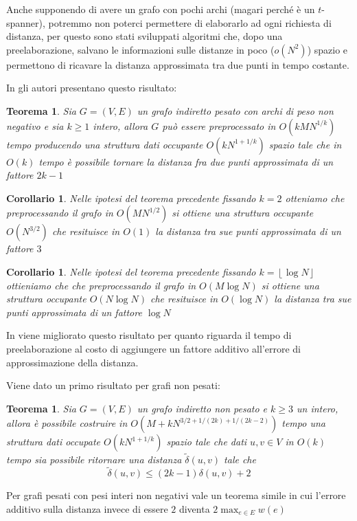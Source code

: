 \documentclass[a4paper,10pt]{amsbook}
\newcounter{counter1}
\theoremstyle{plain}
\newtheorem{myteo}[counter1]{Teorema}
\newtheorem{mycor}[counter1]{Corollario}
\theoremstyle{definition}
\theoremstyle{remark}
\newcommand{\pa}[1]{\left(#1\right)}
\newcommand{\floor}[1]{\left\lfloor#1\right\rfloor}
\begin{document}
Anche supponendo di avere un grafo con pochi archi (magari perch\'e è
un $t$-spanner), potremmo non poterci permettere di elaborarlo ad ogni
richiesta di distanza, per questo sono stati sviluppati algoritmi che,
dopo una preelaborazione, salvano le informazioni sulle distanze in
poco ($o(N^2)$) spazio e permettono di ricavare la distanza
approssimata tra due punti in tempo costante.

In \cite{appdistoracl} gli autori presentano questo risultato:
\begin{myteo}
  Sia $G = (V,E)$ un grafo indiretto pesato con archi di peso non
  negativo e sia $k\ge 1$ intero, allora $G$ pu\`o essere
  preprocessato in $O\pa{kMN^{1/k}}$ tempo producendo una struttura
  dati occupante $O\pa{kN^{1+1/k}}$ spazio tale che in $O\pa{k}$ tempo
  \`e possibile tornare la distanza fra due punti approssimata di un
  fattore $2k-1$
\end{myteo}
\begin{mycor}
  Nelle ipotesi del teorema precedente fissando $k=2$ otteniamo che
  preprocessando il grafo in $O\pa{MN^{1/2}}$ si ottiene una struttura
  occupante $O\pa{N^{3/2}}$ che resituisce in $O\pa{1}$ la distanza
  tra sue punti approssimata di un fattore $3$
\end{mycor}
\begin{mycor}
  Nelle ipotesi del teorema precedente fissando $k=\floor{\log N}$ ottieniamo
  che che preprocessando il grafo in $O\pa{M\log N}$ si ottiene una
  struttura occupante $O\pa{N\log{N}}$ che resituisce in $O\pa{\log N}$ la
  distanza tra sue punti approssimata di un fattore $\log N$
\end{mycor}

In \cite{appdistoraclplus} viene migliorato questo risultato per
quanto riguarda il tempo di preelaborazione al costo di aggiungere un
fattore additivo all'errore di approssimazione della distanza.

Viene dato un primo risultato per grafi non pesati:
\begin{myteo}
  Sia $G = (V,E)$ un grafo indiretto non pesato e $k\ge 3$ un intero,
  allora \`e possibile costruire in $O\pa{ M + kN^{3/2 + 1/(2k) +
      1/\pa{2k-2}}}$ tempo una struttura dati occupate
  $O\pa{kN^{1+1/k}}$ spazio tale che dati $u,v\in V$ in $O\pa{k}$
  tempo sia possibile ritornare una distanza $\tilde \delta\pa{u,v}$
  tale che
  \[ \tilde \delta \pa{ u,v} \le \pa{2k -1}\delta\pa{ u,v} + 2 \]
\end{myteo}

Per grafi pesati con pesi interi non negativi vale un teorema simile
in cui l'errore additivo sulla distanza invece di essere $2$ diventa
$2 \max _{e\in E} w(e)$
\end{document}
